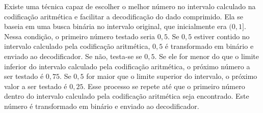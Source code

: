 Existe uma técnica capaz de escolher o
melhor número no intervalo calculado na codificação aritmética e facilitar a
decodificação do dado comprimido. Ela se baseia em uma busca binária no
intervalo original, que inicialmente era $(0, 1]$. Nessa condição, o primeiro
número testado seria $0,5$. Se $0,5$ estiver contido no intervalo calculado pela
codificação aritmética, $0,5$ é transformado em binário e enviado ao
decodificador. Se não, testa-se se $0,5$. Se ele for menor do que o limite
inferior do intervalo calculado pela codificação aritmética, o próximo número a ser testado
é $0,75$. Se $0,5$ for maior que o limite superior do intervalo, o próximo
valor a ser testado é $0,25$. Esse processo se repete até que o primeiro número
dentro do intervalo calculado pela codificação aritmética seja encontrado. Este
número é transformado em binário e enviado ao decodificador. %



